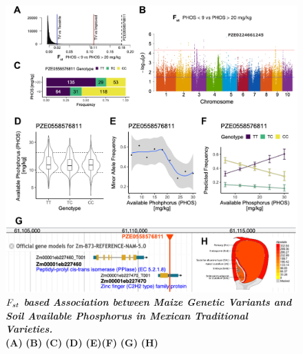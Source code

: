 \begin{figure}[!ht]
\centering
\includegraphics[width=\linewidth]{Chapter-2/figs/PHOS_Fst.png}
\caption[Fst based Association between Maize Genetic Variants and Soil Available Phosphorus in Mexican Traditional Varieties]{\textit{\textbf{ $\boldmath{F_{st}}$ based Association between Maize Genetic Variants and Soil Available Phosphorus in Mexican Traditional Varieties.}}
\\\hspace{\textwidth} 
\textbf{(A)}  \textbf{(B)}  \textbf{(C)} \textbf{(D)} \textbf{(E)}\textbf{(F)} \textbf{(G)} \textbf{(H)} 
 }
\label{fig::PHOS_Fst}
\end{figure}
\clearpage


\printbibliography[heading=subbibintoc, title=References]